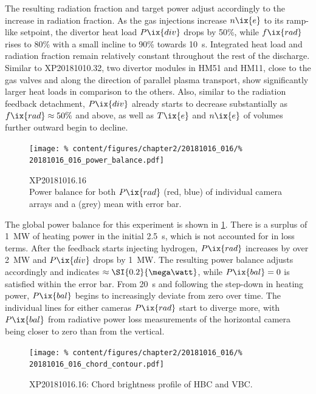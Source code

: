                 The resulting radiation fraction and target power adjust accordingly to the increase in radiation fraction. As the gas injections increase $n\ix{e}$ to its ramp-like setpoint, the divertor heat load $P\ix{div}$ drops by 50\%, while $f\ix{rad}$ rises to 80\% with a small incline to 90\% towards \SI{10}{\second}. Integrated heat load and radiation fraction remain relatively constant throughout the rest of the discharge. Similar to XP20181010.32, two divertor modules in HM51 and HM11, close to the gas valves and along the direction of parallel plasma transport, show significantly larger heat loads in comparison to the others. Also, similar to the radiation feedback detachment, $P\ix{div}$ already starts to decrease substantially as $f\ix{rad}\approx50\%$ and above, as well as $T\ix{e}$ and $n\ix{e}$ of volumes further outward begin to decline.\\%
%
                \begin{figure}[t]%
                    \centering%
                    \texttt{[image: \%
                        content/figures/chapter2/20181016\_016/\%
                        20181016\_016\_power\_balance.pdf]}%
                    \caption{XP20181016.16\\%
                        Power balance for both $P\ix{rad}$ (red, blue) of individual camera arrays and a (grey) mean with error bar.}\label{fig:20181016.16_balance}%
                \end{figure}%
%
                The global power balance for this experiment is shown in \cref{fig:20181016.16_balance}. There is a surplus of \SI{1}{\mega\watt} of heating power in the initial \SI{2.5}{\second}, which is not accounted for in loss terms. After the feedback starts injecting hydrogen, $P\ix{rad}$ increases by over \SI{2}{\mega\watt} and $P\ix{div}$ drops by \SI{1}{\mega\watt}. The resulting power balance adjusts accordingly and indicates $\approx\-\SI{0.2}{\mega\watt}$, while $P\ix{bal}=0$ is satisfied within the error bar. From \SI{20}{\second} and following the step-down in heating power, $P\ix{bal}$ begins to increasingly deviate from zero over time. The individual lines for either cameras $P\ix{rad}$ start to diverge more, with $P\ix{bal}$ from radiative power loss measurements of the horizontal camera being closer to zero than from the vertical.\\%
%
                \begin{figure}[t]%
                    \centering%
                    \texttt{[image: \%
                        content/figures/chapter2/20181016\_016/\%
                        20181016\_016\_chord\_contour.pdf]}%
                    \caption{XP20181016.16: %
                        Chord brightness profile of HBC and VBC.}\label{fig:20181016.16_CP}%
                \end{figure}%
